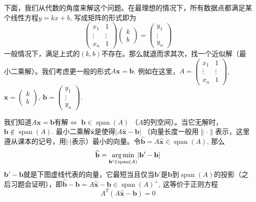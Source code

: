 下面，我们从代数的角度来解这个问题。在最理想的情况下，所有数据点都满足某个线性方程$y = kx + b$, 写成矩阵的形式即为
$$
\begin{pmatrix} x_1 & 1 \\ \vdots & \vdots \\ x_n & 1 \end{pmatrix} \begin{pmatrix} k \\ b \end{pmatrix} = \begin{pmatrix} y_1 \\ \vdots \\ y_n \end{pmatrix}
$$
一般情况下，满足上式的$(k,b)$不存在。那么就退而求其次，找一个近似解（最小二乘解）。我们考虑更一般的形式$A\mathbf{x} = \mathbf{b}$. 例如在这里，$A = \begin{pmatrix} x_1 & 1 \\ \vdots & \vdots \\ x_n & 1 \end{pmatrix}$, $\mathbf{x} = \begin{pmatrix} k \\ b \end{pmatrix}$, $\mathbf{b} = \begin{pmatrix} y_1 \\ \vdots \\ y_n \end{pmatrix}$.

我们知道$A\mathbf{x} = \mathbf{b}$有解$\Longleftrightarrow$ $\mathbf{b} \in \operatorname{span}(A)$ （$A$的列空间）。当它无解时，$\mathbf{b} \not\in \operatorname{span}(A)$. 最小二乘解$\widehat{\mathbf{x}}$是使得$\lvert A\widehat{\mathbf{x}}-\mathbf{b} \rvert$ （向量长度一般用$\lVert \cdot \rVert$表示，这里遵从课本的记号，用$\lvert \cdot \rvert$表示）最小的向量。令$\widehat{\mathbf{b}} = A\widehat{\mathbf{x}} \in \operatorname{span}(A)$, 那么
$$\widehat{\mathbf{b}} = \operatorname*{arg\,min}_{\mathbf{b}' \in \operatorname{span}(A)} \lvert \mathbf{b}' - \mathbf{b} \rvert$$
$\mathbf{b}' - \mathbf{b}$就是下图虚线代表的向量，它最短当且仅当$\mathbf{b}'$是$\mathbf{b}$到$\operatorname{span}(A)$的投影（之后习题会证明），即$\widehat{\mathbf{b}} - \mathbf{b} = A\widehat{\mathbf{x}}-\mathbf{b} \in \operatorname{span}(A)^{\perp}$, 这等价于正则方程
$$A^T(A\widehat{\mathbf{x}}-\mathbf{b}) = 0$$

